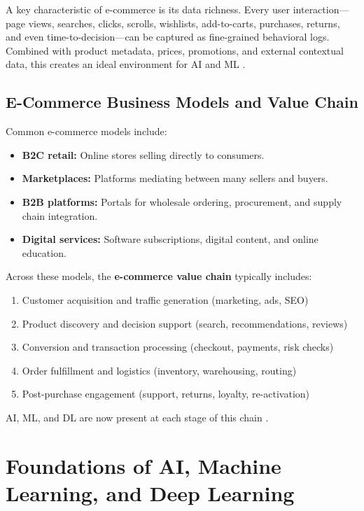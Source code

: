 A key characteristic of e-commerce is its data richness.
Every user interaction---page views, searches, clicks, scrolls, wishlists, add-to-carts, purchases, returns, and even time-to-decision---can be captured as fine-grained behavioral logs.
Combined with product metadata, prices, promotions, and external contextual data, this creates an ideal environment for AI and ML \citep{laudon2024ecommerce,kleppmann2017ddia}.

\subsection{E-Commerce Business Models and Value Chain}
Common e-commerce models include:
\begin{itemize}
  \item \textbf{B2C retail:} Online stores selling directly to consumers.
  \item \textbf{Marketplaces:} Platforms mediating between many sellers and buyers.
  \item \textbf{B2B platforms:} Portals for wholesale ordering, procurement, and supply chain integration.
  \item \textbf{Digital services:} Software subscriptions, digital content, and online education.
\end{itemize}

Across these models, the \textbf{e-commerce value chain} typically includes:
\begin{enumerate}
  \item Customer acquisition and traffic generation (marketing, ads, SEO)
  \item Product discovery and decision support (search, recommendations, reviews)
  \item Conversion and transaction processing (checkout, payments, risk checks)
  \item Order fulfillment and logistics (inventory, warehousing, routing)
  \item Post-purchase engagement (support, returns, loyalty, re-activation)
\end{enumerate}

\noindent AI, ML, and DL are now present at each stage of this chain \citep{laudon2024ecommerce}.

\section{Foundations of AI, Machine Learning, and Deep Learning}
